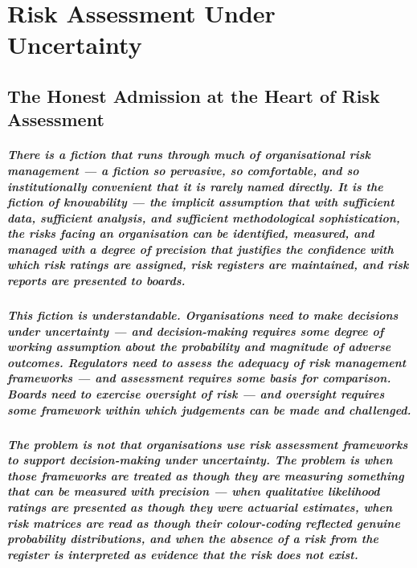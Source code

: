 \chapter{Risk Assessment Under Uncertainty}
\label{chap:Risk Assessment Under Uncertainty}

\section{The Honest Admission at the Heart of Risk Assessment}
\paragraph{There is a fiction that runs through much of organisational risk management — a fiction so pervasive, so comfortable, and so institutionally convenient that it is rarely named directly. It is the fiction of knowability — the implicit assumption that with sufficient data, sufficient analysis, and sufficient methodological sophistication, the risks facing an organisation can be identified, measured, and managed with a degree of precision that justifies the confidence with which risk ratings are assigned, risk registers are maintained, and risk reports are presented to boards.}
\paragraph{This fiction is understandable. Organisations need to make decisions under uncertainty — and decision-making requires some degree of working assumption about the probability and magnitude of adverse outcomes. Regulators need to assess the adequacy of risk management frameworks — and assessment requires some basis for comparison. Boards need to exercise oversight of risk — and oversight requires some framework within which judgements can be made and challenged.}
\paragraph{The problem is not that organisations use risk assessment frameworks to support decision-making under uncertainty. The problem is when those frameworks are treated as though they are measuring something that can be measured with precision — when qualitative likelihood ratings are presented as though they were actuarial estimates, when risk matrices are read as though their colour-coding reflected genuine probability distributions, and when the absence of a risk from the register is interpreted as evidence that the risk does not exist.}
